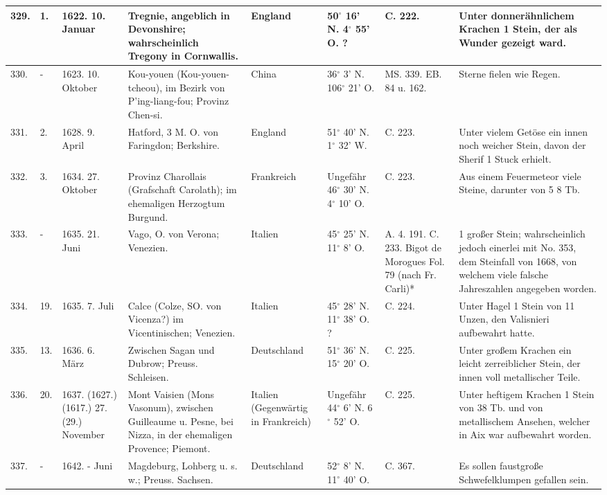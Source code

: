 \documentclass[a4paper, 11pt, oneside, polutonikogreek, german]{article}
\begin{document}
\begin{table}[!ht]
\begin{tabular}{|l|l|l|l|l|l|l|l|}
        329. & 1. & 1622. 10. Januar & Tregnie, angeblich in Devonshire; wahrscheinlich Tregony in Cornwallis. & England & 50$^\circ$ 16' N. 4$^\circ$ 55' O. ? & C. 222. & Unter donnerähnlichem Krachen 1 Stein, der als Wunder gezeigt ward. \\ \hline
        330. & - & 1623. 10. Oktober & Kou-youen (Kou-youen-tcheou), im Bezirk von P’ing-liang-fou; Provinz Chen-si. & China & 36$^\circ$ 3' N. 106$^\circ$ 21' O. & MS. 339. EB. 84 u. 162. & Sterne fielen wie Regen. \\ \hline
        331. & 2. & 1628. 9. April & Hatford, 3 M. O. von Faringdon; Berkshire. & England & 51$^\circ$ 40' N. 1$^\circ$ 32' W. & C. 223. & Unter vielem Getöse ein innen noch weicher Stein, davon der Sherif 1 Stuck erhielt. \\ \hline
        332. & 3. & 1634. 27. Oktober & Provinz Charollais (Grafschaft Carolath); im ehemaligen Herzogtum Burgund. & Frankreich & Ungefähr 46$^\circ$ 30' N. 4$^\circ$ 10' O. & C. 223. & Aus einem Feuermeteor viele Steine, darunter von 5 8 Tb. \\ \hline
        333. & - & 1635. 21. Juni & Vago, O. von Verona; Venezien. & Italien & 45$^\circ$ 25' N. 11$^\circ$ 8' O. & A. 4. 191. C. 233. Bigot de Morogues Fol. 79 (nach Fr. Carli)* & 1 großer Stein; wahrscheinlich jedoch einerlei mit No. 353, dem Steinfall von 1668, von welchem viele falsche Jahreszahlen angegeben worden. \\ \hline
        334. & 19. & 1635. 7. Juli & Calce (Colze, SO. von Vicenza?) im Vicentinischen; Venezien. & Italien & 45$^\circ$ 28' N. 11$^\circ$ 38' O. ? & C. 224. & Unter Hagel 1 Stein von 11 Unzen, den Valisnieri aufbewahrt hatte. \\ \hline
        335. & 13. & 1636. 6. März & Zwischen Sagan und Dubrow; Preuss. Schleisen. & Deutschland & 51$^\circ$ 36' N. 15$^\circ$ 20' O. & C. 225. & Unter großem Krachen ein leicht zerreiblicher Stein, der innen voll metallischer Teile. \\ \hline
        336. & 20. & 1637. (1627.) (1617.) 27. (29.) November & Mont Vaisien (Mons Vasonum), zwischen Guilleaume u. Pesne, bei Nizza, in der ehemaligen Provence; Piemont. & Italien (Gegenwärtig in Frankreich) & Ungefähr 44$^\circ$ 6' N. 6$^\circ$ 52' O. & C. 225. & Unter heftigem Krachen 1 Stein von 38 Tb. und von metallischem Ansehen, welcher in Aix war aufbewahrt worden. \\ \hline
        337. & - & 1642. - Juni & Magdeburg, Lohberg u. s. w.; Preuss. Sachsen. & Deutschland & 52$^\circ$ 8' N. 11$^\circ$ 40' O. & C. 367. & Es sollen faustgroße Schwefelklumpen gefallen sein. \\ \hline

\end{tabular}
\end{table}
\end{document}
